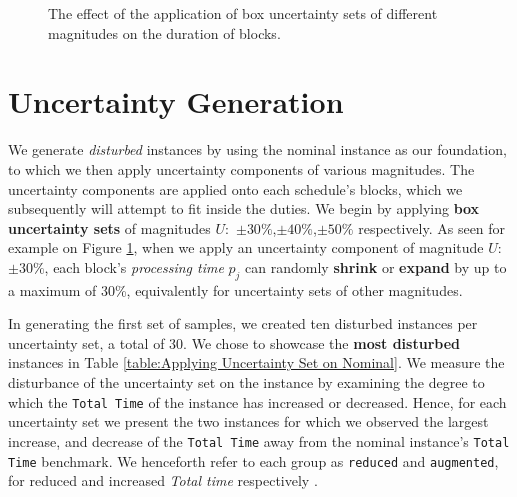 \begin{figure}
    \caption{The effect of the application of box uncertainty sets of different magnitudes on the duration of blocks.}
    \label{fig:Generating Uncertainty}
\end{figure}

\section{Uncertainty Generation}
\label{section: Generating Uncertainty}
We generate \textit{disturbed} instances by using the nominal instance as our foundation, to which we then apply uncertainty components of various magnitudes. The uncertainty components are applied onto each schedule's blocks, which we subsequently will attempt to fit inside the duties. We begin by applying \textbf{box uncertainty sets} of magnitudes $U:$ $\pm30\%$,$\pm40\%$,$\pm50\%$ respectively. As seen for example on Figure \ref{fig:Generating Uncertainty}, when we apply an uncertainty component of magnitude $U$: $\pm30\%$, each block's \textit{processing time} $p_j$ can randomly \textbf{shrink} or \textbf{expand} by up to a maximum of 30\%, equivalently for uncertainty sets of other magnitudes. 


\vspace{\baselineskip}
\noindent
In generating the first set of samples, we created ten disturbed instances per uncertainty set, a total of 30. We chose to showcase the \textbf{most disturbed} instances in Table \ref{table:Applying Uncertainty Set on Nominal}. We measure the disturbance of the uncertainty set on the instance by examining the degree to which the \texttt{Total Time} of the instance has increased or decreased. Hence, for each uncertainty set we present the two instances for which we observed the largest increase, and decrease of the \texttt{Total Time} away from the nominal instance's \texttt{Total Time} benchmark. We henceforth refer to each group as \texttt{reduced} and \texttt{augmented}, for reduced and increased \textit{Total time} respectively \cite{DBLP:journals/corr/abs-1805-03437}. 


